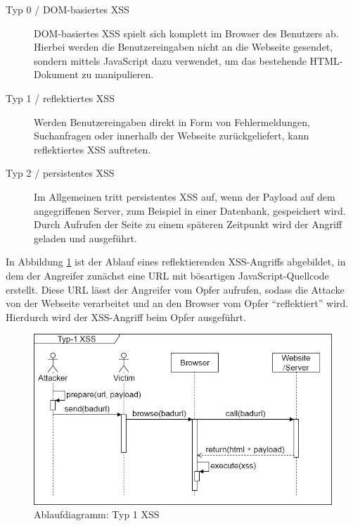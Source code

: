 		\begin{description}
			\item[Typ 0 / \acs{DOM}-basiertes \ac{XSS}] \ac{DOM}-basiertes XSS spielt sich komplett im Browser des Benutzers ab. Hierbei werden die Benutzereingaben nicht an die Webseite gesendet, sondern mittels JavaScript dazu verwendet, um das bestehende HTML-Dokument zu manipulieren.
			\item[Typ 1 / reflektiertes \ac{XSS}] Werden Benutzereingaben direkt in Form von Fehlermeldungen, Suchanfragen oder innerhalb der Webseite zurückgeliefert, kann reflektiertes \ac{XSS} auftreten.
			\item[Typ 2 / persistentes \ac{XSS}] Im Allgemeinen tritt persistentes \ac{XSS} auf, wenn der Payload auf dem angegriffenen Server, zum Beispiel in einer Datenbank, gespeichert wird. Durch Aufrufen der Seite zu einem späteren Zeitpunkt wird der Angriff geladen und ausgeführt.
		\end{description}
		
		In Abbildung \ref{fig:flowchartXSSType1} ist der Ablauf eines reflektierenden \ac{XSS}-Angriffs abgebildet, in dem der  Angreifer zunächst eine \ac{URL} mit bösartigen JavaScript-Quellcode erstellt. Diese \ac{URL} lässt der Angreifer vom Opfer aufrufen, sodass die Attacke von der Webseite verarbeitet und an den Browser vom Opfer ``reflektiert'' wird. Hierdurch wird der \ac{XSS}-Angriff beim Opfer ausgeführt.
		
		\begin{figure}[htbp] 
			\centering
			\includegraphics[width=\textwidth]{contents/images/FlowchartXSSType1}
			\caption{Ablaufdiagramm: Typ 1 XSS}
			\label{fig:flowchartXSSType1}
		\end{figure}
	
\FloatBarrier
		
